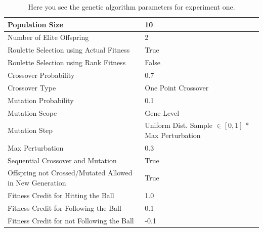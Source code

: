\documentclass[a4paper,10pt]{article}
\begin{document}
\begin{table}[H]
\centering
\footnotesize
\begin{tabular}{ |>{\columncolor[gray]{0.8}} l | l| }
\hline
Population Size                                                      & 10                                                        \\ \hline
Number of Elite Offspring                                            & 2                                                         \\ \hline
Roulette Selection using Actual Fitness                              & True                                                      \\ \hline
Roulette Selection using Rank Fitness                                & False                                                     \\ \hline
Crossover Probability                                                & 0.7                                                       \\ \hline
Crossover Type                                                       & One Point Crossover                                       \\ \hline
Mutation Probability                                                 & 0.1                                                       \\ \hline
Mutation Scope                                                       & Gene Level                                                \\ \hline
Mutation Step                                                        & Uniform Dist. Sample $\in[0,1]$ * Max Perturbation        \\ \hline
Max Perturbation                                                     & 0.3                                                       \\ \hline
Sequential Crossover and Mutation                                    & True                                                      \\ \hline
Offspring not Crossed/Mutated Allowed in New Generation              & True                                                      \\ \hline
Fitness Credit for Hitting the Ball                                  & 1.0                                                       \\ \hline
Fitness Credit for Following the Ball                                & 0.1                                                       \\ \hline
Fitness Credit for not Following the Ball                            & -0.1                                                      \\ \hline
\end{tabular}
\caption{Here you see the genetic algorithm parameters for experiment one.}
\label{tab:exp1}
\end{table}
\end{document}
